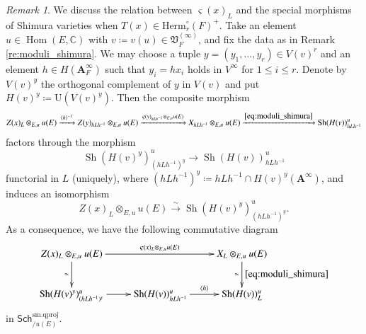 \documentclass[12pt]{amsart}
\numberwithin{equation}{section}
\theoremstyle{plain}
\theoremstyle{definition}
\theoremstyle{remark}
\newtheorem{remark}[proposition]{Remark}
\renewcommand{\b}[1]{\mathbf{#1}}
\renewcommand{\d}[1]{\mathbb{#1}}
\newcommand{\f}[1]{\mathfrak{#1}}
\renewcommand{\r}[1]{\mathrm{#1}}
\renewcommand{\sf}[1]{\mathsf{#1}}
\renewcommand{\(}{\left(}
\renewcommand{\)}{\right)}
\newcommand{\ang}[1]{\langle{#1}\rangle}
\renewcommand{\leq}{\leqslant}
\newcommand{\bA}{\b A}
\newcommand{\dC}{\d C}
\newcommand{\fV}{\f V}
\newcommand{\rU}{\r U}
\newcommand{\Herm}{\r{Herm}}
\newcommand{\smq}{\r{sm.qproj}}
\newcommand{\Sch}{\sf{Sch}}
\DeclareMathOperator{\Hom}{Hom}
\DeclareMathOperator{\Sh}{Sh}
\begin{document}
\begin{remark}\label{re:special_morphism_shimura}
We discuss the relation between $\varsigma(x)_L$ and the special morphisms of Shimura varieties when $T(x)\in\Herm_r^\circ(F)^+$. Take an element $u\in\Hom(E,\dC)$ with $v\coloneqq v(u)\in\fV_F^{(\infty)}$, and fix the data as in Remark \ref{re:moduli_shimura}. We may choose a tuple $y=(y_1,\dots,y_r)\in V(v)^r$ and an element $h\in H(\bA_F^\infty)$ such that $y_i=hx_i$ holds in $V^\infty$ for $1\leq i\leq r$. Denote by $V(v)^y$ the orthogonal complement of $y$ in $V(v)$ and put $H(v)^y\coloneqq\rU(V(v)^y)$. Then the composite morphism
\[
Z(x)_L\otimes_{E,u}u(E)\xrightarrow{\ang{h}^{-1}}Z(y)_{hLh^{-1}}\otimes_{E,u}u(E)
\xrightarrow{\varsigma(y)_{hLh^{-1}}\otimes_{E,u}u(E)}X_{hLh^{-1}}\otimes_{E,u}u(E)
\xrightarrow{\eqref{eq:moduli_shimura}}\Sh(H(v))_{hLh^{-1}}^u
\]
factors through the morphism
\[
\Sh(H(v)^y)^u_{(hLh^{-1})^y} \to \Sh(H(v))_{hLh^{-1}}^u
\]
functorial in $L$ (uniquely), where $(hLh^{-1})^y\coloneqq hLh^{-1}\cap H(v)^y(\bA^\infty)$, and induces an isomorphism
\[
Z(x)_L\otimes_{E,u}u(E)\xrightarrow\sim\Sh(H(v)^y)^u_{(hLh^{-1})^y}.
\]
As a consequence, we have the following commutative diagram
\[
\xymatrix{
Z(x)_L\otimes_{E,u}u(E) \ar[rr]^-{\varsigma(x)_L\otimes_{E,u}u(E)}\ar[d]_-\simeq && X_L\otimes_{E,u}u(E) \ar[d]_-\simeq^-{\eqref{eq:moduli_shimura}} \\
\Sh(H(v)^y)^u_{(hLh^{-1})^y} \ar[r]& \Sh(H(v))_{hLh^{-1}}^u  \ar[r]^-{\ang{h}} & \Sh(H(v))_L^u
}
\]
in $\Sch^\smq_{/u(E)}$.
\end{remark}
\end{document}
